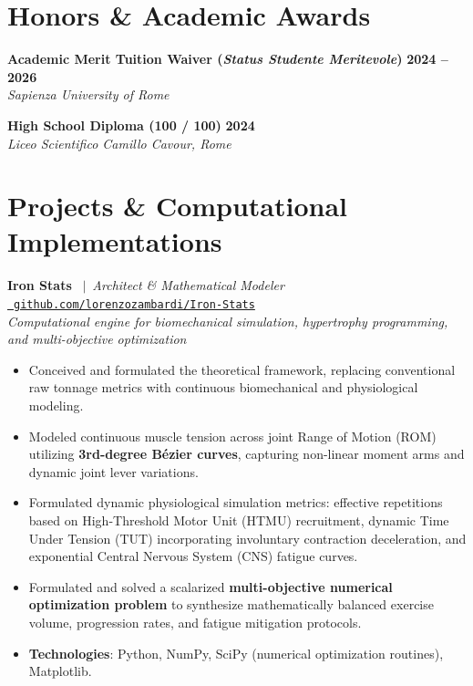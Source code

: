 \documentclass[10pt,a4paper]{article}
\begin{document}
\section{Honors \& Academic Awards}

\noindent
\textbf{Academic Merit Tuition Waiver (\textit{Status Studente Meritevole})} \hfill \textbf{2024 -- 2026} \\
\textit{Sapienza University of Rome}

\vspace{4pt}
\noindent
\textbf{High School Diploma (100 / 100)} \hfill \textbf{2024} \\
\textit{Liceo Scientifico Camillo Cavour, Rome}

\clearpage

\section{Projects \& Computational Implementations}

\noindent
\textbf{Iron Stats} \ $\vert$\ \textit{Architect \& Mathematical Modeler} \hfill \href{https://github.com/lorenzozambardi/Iron-Stats}{\faGithub\ \texttt{github.com/lorenzozambardi/Iron-Stats}} \\
\textit{Computational engine for biomechanical simulation, hypertrophy programming, and multi-objective optimization}
\begin{itemize}
    \item Conceived and formulated the theoretical framework, replacing conventional raw tonnage metrics with continuous biomechanical and physiological modeling.
    \item Modeled continuous muscle tension across joint Range of Motion (ROM) utilizing \textbf{3rd-degree Bézier curves}, capturing non-linear moment arms and dynamic joint lever variations.
    \item Formulated dynamic physiological simulation metrics: effective repetitions based on High-Threshold Motor Unit (HTMU) recruitment, dynamic Time Under Tension (TUT) incorporating involuntary contraction deceleration, and exponential Central Nervous System (CNS) fatigue curves.
    \item Formulated and solved a scalarized \textbf{multi-objective numerical optimization problem} to synthesize mathematically balanced exercise volume, progression rates, and fatigue mitigation protocols.
    \item \textbf{Technologies}: Python, NumPy, SciPy (numerical optimization routines), Matplotlib.
\end{itemize}
\end{document}
